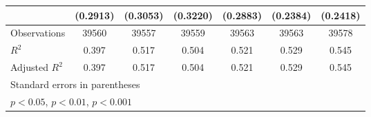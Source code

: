 {\begin{tabular}{l*{6}{c}}
                    &    (0.2913)         &    (0.3053)         &    (0.3220)         &    (0.2883)         &    (0.2384)         &    (0.2418)         \\
\midrule
Observations        &       39560         &       39557         &       39559         &       39563         &       39563         &       39578         \\
\(R^{2}\)           &       0.397         &       0.517         &       0.504         &       0.521         &       0.529         &       0.545         \\
Adjusted \(R^{2}\)  &       0.397         &       0.517         &       0.504         &       0.521         &       0.529         &       0.545         \\
\bottomrule
\multicolumn{7}{l}{\footnotesize Standard errors in parentheses}\\
\multicolumn{7}{l}{\footnotesize \sym{*} \(p<0.05\), \sym{**} \(p<0.01\), \sym{***} \(p<0.001\)}\\
\end{tabular}
}
